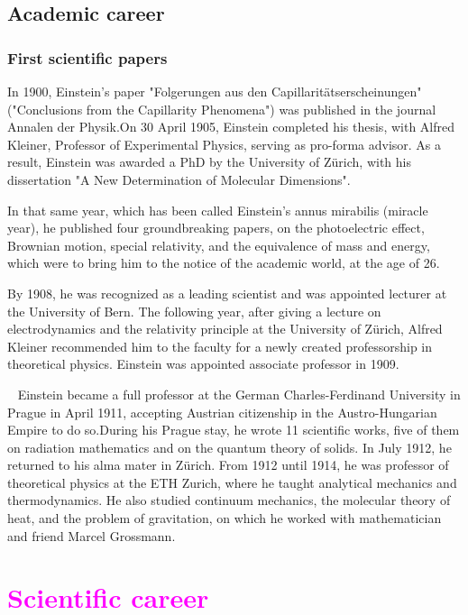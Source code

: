 \documentclass{article}
\begin{document}
\subsection{Academic career}
\subsubsection{First scientific papers}
In 1900, Einstein's paper "Folgerungen aus den Capillaritätserscheinungen" ("Conclusions from the Capillarity Phenomena") was published in the journal Annalen der Physik.On 30 April 1905, Einstein completed his thesis, with Alfred Kleiner, Professor of Experimental Physics, serving as pro-forma advisor. As a result, Einstein was awarded a PhD by the University of Zürich, with his dissertation "A New Determination of Molecular Dimensions".

In that same year, which has been called Einstein's annus mirabilis (miracle year), he published four groundbreaking papers, on the photoelectric effect, Brownian motion, special relativity, and the equivalence of mass and energy, which were to bring him to the notice of the academic world, at the age of 26.

\begin{flushleft}
By 1908, he was recognized as a leading scientist and was appointed lecturer at the University of Bern. The following year, after giving a lecture on electrodynamics and the relativity principle at the University of Zürich, Alfred Kleiner recommended him to the faculty for a newly created professorship in theoretical physics. Einstein was appointed associate professor in 1909.

~\newline
Einstein became a full professor at the German Charles-Ferdinand University in Prague in April 1911, accepting Austrian citizenship in the Austro-Hungarian Empire to do so.During his Prague stay, he wrote 11 scientific works, five of them on radiation mathematics and on the quantum theory of solids. In July 1912, he returned to his alma mater in Zürich. From 1912 until 1914, he was professor of theoretical physics at the ETH Zurich, where he taught analytical mechanics and thermodynamics. He also studied continuum mechanics, the molecular theory of heat, and the problem of gravitation, on which he worked with mathematician and friend Marcel Grossmann.
\end{flushleft}




\section{\textcolor{magenta}{Scientific career}}
\end{document}
